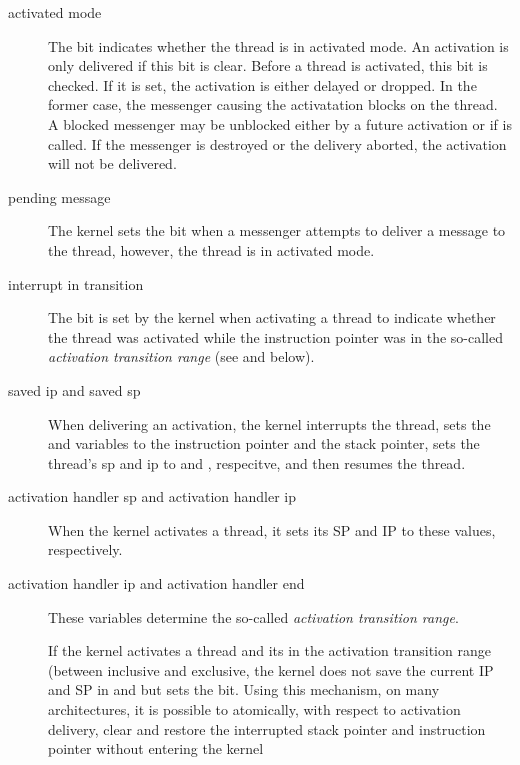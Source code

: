 \begin{description}

\item[activated mode]

The  bit indicates whether the thread is in
activated mode.  An activation is only delivered if this bit is clear.
Before a thread is activated, this bit is checked.  If it is set, the
activation is either delayed or dropped.  In the former case, the
messenger causing the activatation blocks on the thread.  A blocked
messenger may be unblocked either by a future activation or if
 is called.  If the messenger is
destroyed or the delivery aborted, the activation will not be
delivered.

\item[pending message]

The kernel sets the  bit when a messenger
attempts to deliver a message to the thread, however, the thread is in
activated mode.

\item[interrupt in transition]

The  bit is set by the kernel when
activating a thread to indicate whether the thread was activated while
the instruction pointer was in the so-called \emph{activation
  transition range} (see  and
 below).

\item[saved ip \textmd{and} saved sp]

When delivering an activation, the kernel interrupts the thread, sets
the  and  variables to the instruction
pointer and the stack pointer, sets the thread's sp and ip to
 and ,
respecitve, and then resumes the thread.

\item[activation handler sp \textmd{and} activation handler ip]

When the kernel activates a thread, it sets its SP and IP to these
values, respectively.

\item[activation handler ip \textmd{and} activation handler end]

These variables determine the so-called \emph{activation transition
  range}.

If the kernel activates a thread and its in the activation transition
range (between  inclusive and
 exclusive, the kernel does not save the
current IP and SP in  and  but sets the
 bit.  Using this mechanism, on many
architectures, it is possible to atomically, with respect to
activation delivery, clear  and restore the
interrupted stack pointer and instruction pointer without entering the
kernel


\end{description}
